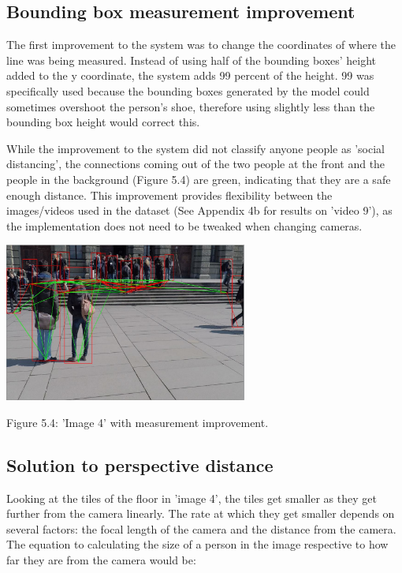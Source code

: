 \documentclass[12pt]{report}
\begin{document}
\subsection*{Bounding box measurement improvement}

The first improvement to the system was to change the coordinates of where the line was being measured. Instead of using half of the bounding boxes' height added to the y coordinate, the system adds 99 percent of the height. 99 was specifically used because the bounding boxes generated by the model could sometimes overshoot the person's shoe, therefore using slightly less than the bounding box height would correct this. 

\vspace{2mm}

While the improvement to the system did not classify anyone people as 'social distancing', the connections coming out of the two people at the front and the people in the background  (Figure 5.4) are green, indicating that they are a safe enough distance. This improvement provides flexibility between the images/videos used in the dataset (See Appendix 4b for results on 'video 9'), as the implementation does not need to be tweaked when changing cameras. 

\begin{center}
	\includegraphics[width=80mm]{./images/appendix/BoundingBoxBottom.JPG}
	
	{\footnotesize Figure 5.4: 'Image 4' with measurement improvement.}
\end{center}

\subsection*{Solution to perspective distance}

Looking at the tiles of the floor in 'image 4', the tiles get smaller as they get further from the camera linearly. The rate at which they get smaller depends on several factors: the focal length of the camera and the distance from the camera. The equation to calculating the size of a person in the image respective to how far they are from the camera would be:
\end{document}
